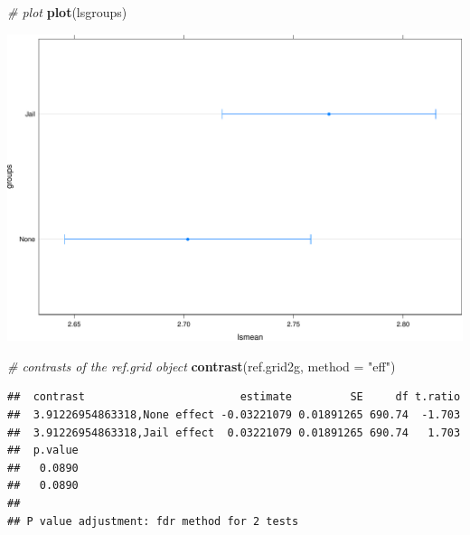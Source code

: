 \documentclass[ignorenonframetext,]{beamer}
\newenvironment{Shaded}{\begin{snugshade}}{\end{snugshade}}
\newcommand{\KeywordTok}[1]{\textcolor[rgb]{0.13,0.29,0.53}{\textbf{{#1}}}}
\newcommand{\DataTypeTok}[1]{\textcolor[rgb]{0.13,0.29,0.53}{{#1}}}
\newcommand{\StringTok}[1]{\textcolor[rgb]{0.31,0.60,0.02}{{#1}}}
\newcommand{\CommentTok}[1]{\textcolor[rgb]{0.56,0.35,0.01}{\textit{{#1}}}}
\newcommand{\NormalTok}[1]{{#1}}
\begin{document}
\begin{frame}[fragile]

\begin{Shaded}
\begin{Highlighting}[]
\CommentTok{# plot}
\KeywordTok{plot}\NormalTok{(lsgroups)}
\end{Highlighting}
\end{Shaded}

\includegraphics{Conditional_Models_files/figure-beamer/unnamed-chunk-37-1.pdf}

\end{frame}

\begin{frame}[fragile]

\begin{Shaded}
\begin{Highlighting}[]
\CommentTok{# contrasts of the ref.grid object}
\KeywordTok{contrast}\NormalTok{(ref.grid2g, }\DataTypeTok{method =} \StringTok{"eff"}\NormalTok{)}
\end{Highlighting}
\end{Shaded}

\begin{verbatim}
##  contrast                        estimate         SE     df t.ratio
##  3.91226954863318,None effect -0.03221079 0.01891265 690.74  -1.703
##  3.91226954863318,Jail effect  0.03221079 0.01891265 690.74   1.703
##  p.value
##   0.0890
##   0.0890
## 
## P value adjustment: fdr method for 2 tests
\end{verbatim}

\end{frame}
\end{document}
